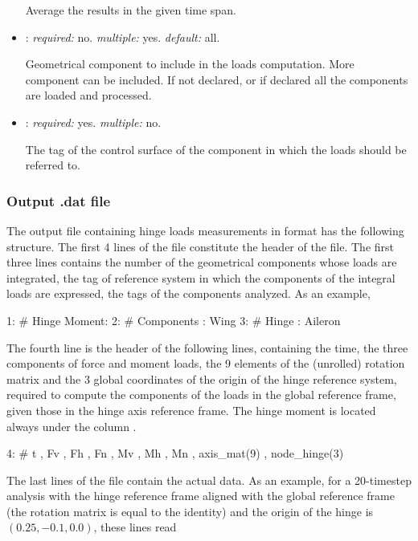 \begin{itemize}
Average the results in the given time span.

\item {}: \textit{required:} no. \textit{multiple:} yes. \textit{default:} all.

Geometrical component to include in the loads computation. More component can be included. If not declared, or if declared  all the components are loaded and processed. 

\item {}: \textit{required:} yes. \textit{multiple:} no.

The tag of the control surface of the component in which the loads should be referred to. 

\end{itemize}

\subsubsection{Output .dat file}
The output file containing hinge loads measurements in  format has the following structure.
The first 4 lines of the file constitute the header of the file. The first three lines contains the number of the geometrical components  whose loads are integrated, the tag of reference system in which the components of the integral loads are expressed, the tags of the  components analyzed. As an example,
\begin{inputfile}
 1: # Hinge Moment: 
 2: #               Components  : Wing
 3: #                    Hinge  : Aileron
\end{inputfile}
The fourth line is the header of the following lines, containing the time, the three components of force and moment loads, the 9 elements of the (unrolled) rotation matrix and the 3 global coordinates of the origin of the hinge reference system, required to compute the components of the loads in the global reference frame, given those in the hinge axis reference frame. The hinge moment is located always under the column . 
\begin{inputfile}
 4: #  t , Fv , Fh , Fn , Mv , Mh , Mn , axis_mat(9) , node_hinge(3) 
\end{inputfile}
The last lines of the file contain the actual data. As an example, for a 20-timestep analysis with the hinge  reference frame  aligned with the global reference frame (the rotation matrix is equal to the identity) and the origin of the hinge is $(0.25,-0.1,0.0)$, these lines read
